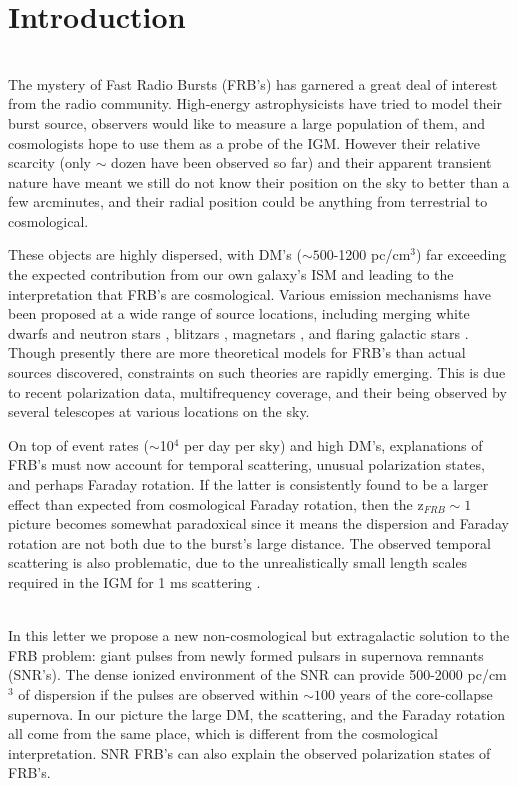 \documentclass[useAMS,usenatbib]{emulateapj}
\begin{document}
\section{Introduction}
\\
The mystery of Fast Radio Bursts (FRB's) has garnered
a great deal of interest from the radio community.
High-energy astrophysicists have tried to model their burst source, 
observers would like to measure a large population of them, and cosmologists
hope to use them as a probe of the IGM. However their relative scarcity 
(only $\sim$ dozen have been observed so far) and their apparent 
transient nature have meant we still do not know their position on the sky
to better than a few arcminutes, and their radial position could be anything
from terrestrial to cosmological.

These objects are
highly dispersed, with DM's ($\sim 500$-1200 pc/cm$^3$) far exceeding
the expected contribution from our own galaxy's ISM and leading to the
interpretation that FRB's are cosmological. 
Various emission mechanisms have been proposed 
at a wide range of source locations, 
including merging white dwarfs \citep{2012ApJ...760...64M}
and neutron stars \citep{2013PASJ...65L..12T},
blitzars \citep{2014A&A...562A.137F}, 
magnetars \citep{2015arXiv150101341P, 2014MNRAS.442L...9L}, 
and flaring galactic stars \citep{2004ApJ...615..253P}.
Though presently there are more theoretical models for FRB's than actual 
sources discovered, constraints on such theories are rapidly emerging. 
This is due to recent polarization data, 
multifrequency coverage, and their being observed by several telescopes
at various locations on the sky. 

On top of event rates ($\sim$10$^4$ per day per sky) 
and high DM's, explanations of FRB's must now
account for temporal scattering, unusual polarization states, and perhaps Faraday
rotation. If the latter is consistently found to be a larger effect than expected from
cosmological Faraday rotation, then the z$_{FRB} \sim 1$ picture becomes somewhat
paradoxical since it means the dispersion and Faraday rotation are not both due to
the burst's large distance. The observed temporal scattering is also problematic, due 
to the unrealistically small length scales required in the IGM 
for 1 ms scattering \citep{2014ApJ...785L..26L}. 

\\
In this letter we propose a new non-cosmological but extragalactic
solution to the FRB problem: giant pulses from newly formed pulsars in 
supernova remnants (SNR's). The dense ionized environment of the SNR
can provide 500-2000 pc/cm$^3$ of dispersion if the pulses are observed 
within $\sim100$ years of the core-collapse supernova. In our picture the 
large DM, the scattering, and the Faraday rotation all come from the same place, 
which is different from the cosmological interpretation.
SNR FRB's can also explain the observed polarization states of FRB's. 
\end{document}
